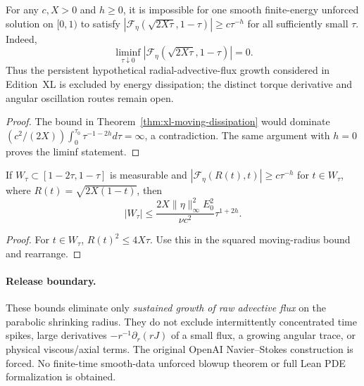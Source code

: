 \begin{corollary}
\label{cor:xl-terminal-flux-impossible}
For any $c,X>0$ and $h\ge0$, it is impossible for one
smooth finite-energy unforced solution on $[0,1)$ to satisfy
$|\mathcal F_\eta(\sqrt{2X\tau},1-\tau)|\ge
c\tau^{-h}$ for all sufficiently small $\tau$.
Indeed,
\[
\boxed{\quad\liminf_{\tau\downarrow0}
|\mathcal F_\eta(\sqrt{2X\tau},1-\tau)|=0.\quad}
\]
Thus the persistent hypothetical radial-advective-flux growth
considered in Edition~XL is excluded by energy dissipation;
the distinct torque derivative and angular oscillation routes remain open.
\end{corollary}
\begin{proof}
The bound in Theorem~\ref{thm:xl-moving-dissipation}
would dominate $(c^2/(2X))\int_0^{\tau_0}
\tau^{-1-2h}d\tau=\infty$, a contradiction.
The same argument with $h=0$ proves the liminf statement.
\end{proof}

\begin{corollary}
\label{cor:xl-spike-duration}
If $W_\tau\subset[1-2\tau,1-\tau]$ is measurable and
$|\mathcal F_\eta(R(t),t)|\ge c\tau^{-h}$
for $t\in W_\tau$, where $R(t)=\sqrt{2X(1-t)}$, then
\begin{equation}\label{eq:xl-spike-duration}
\boxed{\quad |W_\tau|\le
\frac{2X\|\eta\|_\infty^2E_0^2}{\nu c^2}
\tau^{1+2h}.\quad}
\end{equation}
\end{corollary}
\begin{proof}
For $t\in W_\tau$, $R(t)^2\le4X\tau$.
Use this in the squared moving-radius bound and rearrange.
\end{proof}

\paragraph{Release boundary.}
These bounds eliminate only \emph{sustained growth of raw
advective flux} on the parabolic shrinking radius.
They do not exclude intermittently concentrated time spikes,
large derivatives $-r^{-1}\partial_r(rJ)$ of a small flux,
a growing angular trace, or physical viscous/axial terms.
The original OpenAI Navier--Stokes construction is forced.
No finite-time smooth-data unforced blowup theorem or full Lean PDE
formalization is obtained.
